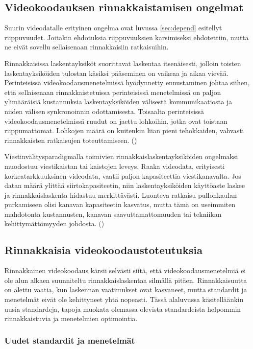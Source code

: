 \subsection{Videokoodauksen rinnakkaistamisen ongelmat}
\label{sec:problems}

Suurin videodatalle erityinen ongelma ovat luvussa \ref{sec:depend} esitellyt riippuvuudet.
Joitakin ehdotuksia riippuvuuksien
karsimiseksi ehdotettiin, mutta ne eivät sovellu sellaisenaan rinnakkaisiin
ratkaisuihin. 

Rinnakkaisissa laskentayksiköt suorittavat laskentaa itsenäisesti, jolloin
toisten laskentayksiköiden tulostan käsiksi pääseminen on vaikeaa ja
aikaa vievää. Perinteisissä videokoodausmenetelmissä hyödynnetty ennustaminen
johtaa siihen, että sellaisenaan rinnakkaistetuissa perinteisissä menetelmissä
on paljon ylimääräisiä kustannuksia laskentayksiköiden välisestä
kommunikaatiosta ja niiden välisen synkronoinnin odottamisesta. Toisaalta
perinteisissä videokoodausmenetelmissä ruudut on jaettu lohkoihin, jotka ovat
toistaan riippumattomat. Lohkojen määrä on kuitenkin liian pieni tehokkaiden,
vahvasti rinnakkaisten ratkaisujen toteuttamiseen. (\citealt{pieters})

Viestinvälitysparadigmalla toimivien rinnakkaislaskentayksiköiden ongelmaksi
muodostuu viestikaistan tai kaistojen leveys. Raaka videodata, erityisesti
korkeatarkkuuksinen videodata, vaatii paljon kapasiteettia viestikanavalta. Jos
datan määrä ylittää siirtokapasiteetin, niin laskentayksiköiden käyttöaste
laskee ja rinnakkaislaskenta hidastuu merkittävästi. Luonteva ratkaisu
pullonkaulan purkamiseen olisi kanavan kapasiteetin kasvatus, mutta tämä on
useimmiten mahdotonta kustannusten, kanavan saavuttamattomuuden tai tekniikan
kehittymättömyyden johdosta. (\citealt{li})

\subsection{Rinnakkaisia videokoodaustoteutuksia}

Rinnakkainen videokoodaus kärsii selvästi siitä, että
videokoodausmenetelmiä ei ole alun alkaen suunniteltu rinnakkaislaskentaa
silmällä pitäen. Rinnakkaisuutta on alettu vaatia, kun laskennan vaatimukset
ovat kasvaneet, mutta standardit ja menetelmät eivät ole kehittyneet
yhtä nopeasti. Tässä alaluvussa käsitelläänkin uusia standardeja, tapoja
muokata olemassa olevista standardeista helpommin rinnakkaistuvia ja menetelmien
optimointia.

\subsubsection{Uudet standardit ja menetelmät}

